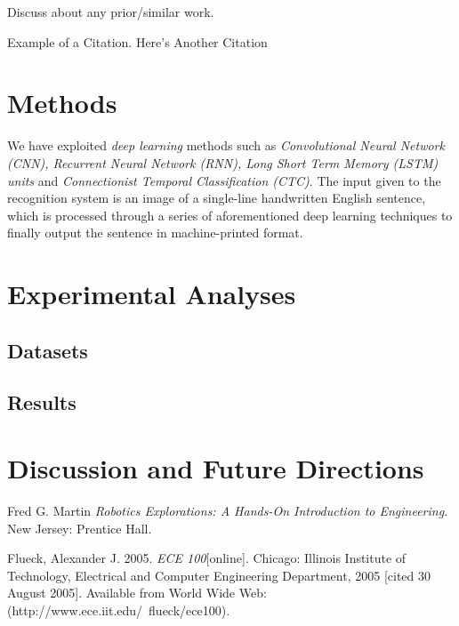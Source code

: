 \documentclass[a4paper, 10pt,twocolumn]{article}
\begin{document}
Discuss about any prior/similar work. 

Example of a Citation\cite[p.219]{Robotics}. Here's 
Another Citation\cite{Flueck} %

\section{Methods}
We have exploited \emph{deep learning} methods such as \emph{Convolutional Neural Network (CNN), Recurrent Neural Network (RNN), Long Short Term Memory (LSTM) units} and \emph{Connectionist Temporal Classification (CTC)}. The input given to the recognition system is an image of a single-line handwritten English sentence, which is processed through a series of aforementioned deep learning techniques to finally output the sentence in machine-printed format.

\section{Experimental Analyses} 

\subsection*{Datasets} 
\subsection*{Results} 

\section{Discussion and Future Directions} 

\begin{thebibliography}{9}
	

 Fred G. Martin \emph{Robotics Explorations: A 
Hands-On Introduction to Engineering}. New Jersey: Prentice Hall.

  Flueck, Alexander J. 2005. \emph{ECE 
100}[online]. Chicago: Illinois Institute of Technology, Electrical 
and Computer Engineering Department, 2005 [cited 30
August 2005]. Available from World Wide Web: (http://www.ece.iit.edu/~flueck/ece100).

\end{thebibliography}
\end{document}
